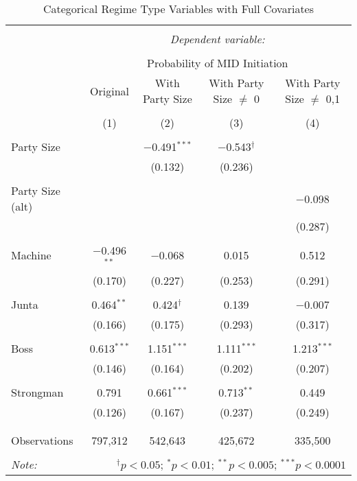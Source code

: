 
\begin{table}[!htbp] \centering 
  \caption{Categorical Regime Type Variables with Full Covariates} 
  \label{} 
\begin{tabular}{@{\extracolsep{5pt}}lcccc} 
\\[-1.8ex]\hline 
\hline \\[-1.8ex] 
 & \multicolumn{4}{c}{\textit{Dependent variable:}} \\ 
\cline{2-5} 
\\[-1.8ex] & \multicolumn{4}{c}{Probability of MID Initiation} \\ 
 & Original & With Party Size & With Party Size ${\neq}$ 0 & With Party Size ${\neq}$ {0,1} \\ 
\\[-1.8ex] & (1) & (2) & (3) & (4)\\ 
\hline \\[-1.8ex] 
 Party Size &  & $-$0.491$^{***}$ & $-$0.543$^{\dagger}$ &  \\ 
  &  & (0.132) & (0.236) &  \\ 
  & & & & \\ 
 Party Size (alt) &  &  &  & $-$0.098 \\ 
  &  &  &  & (0.287) \\ 
  & & & & \\ 
 Machine & $-$0.496$^{**}$ & $-$0.068 & 0.015 & 0.512 \\ 
  & (0.170) & (0.227) & (0.253) & (0.291) \\ 
  & & & & \\ 
 Junta & 0.464$^{**}$ & 0.424$^{\dagger}$ & 0.139 & $-$0.007 \\ 
  & (0.166) & (0.175) & (0.293) & (0.317) \\ 
  & & & & \\ 
 Boss & 0.613$^{***}$ & 1.151$^{***}$ & 1.111$^{***}$ & 1.213$^{***}$ \\ 
  & (0.146) & (0.164) & (0.202) & (0.207) \\ 
  & & & & \\ 
 Strongman & 0.791 & 0.661$^{***}$ & 0.713$^{**}$ & 0.449 \\ 
  & (0.126) & (0.167) & (0.237) & (0.249) \\ 
  & & & & \\ 
\hline \\[-1.8ex] 
Observations & 797,312 & 542,643 & 425,672 & 335,500 \\ 
\hline 
\hline \\[-1.8ex] 
\textit{Note:}  & \multicolumn{4}{r}{$^{\dagger} p<0.05$; $^{*} p<0.01$; $^{**} p<0.005$; $^{***} p<0.0001$} \\ 
\end{tabular} 
\end{table} 
